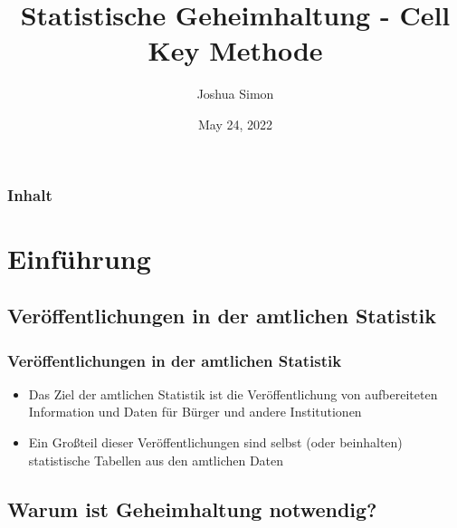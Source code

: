 \documentclass[aspectratio=169]{beamer}
\title[Statistische Geheimhaltung]{Statistische Geheimhaltung - Cell Key Methode} %
\author{Joshua Simon} %
\institute[University Bamberg] %
{
Otto-Friedrich-University Bamberg \\ %
\medskip
\textit{joshua-guenter.simon@stud.uni-bamberg.de} %
}
\date{May 24, 2022} %
\begin{document}
\begin{frame}
\titlepage %
\end{frame}

\begin{frame}
\frametitle{Inhalt} %
\tableofcontents %
\end{frame}



\section{Einführung} 

\subsection{Veröffentlichungen in der amtlichen Statistik}

\begin{frame}{}
    \frametitle{Veröffentlichungen in der amtlichen Statistik}
    \begin{itemize}
        \item Das Ziel der amtlichen Statistik ist die Veröffentlichung von aufbereiteten Information und Daten für Bürger und andere Institutionen
        \item Ein Großteil dieser Veröffentlichungen sind selbst (oder beinhalten) statistische Tabellen aus den amtlichen Daten
    \end{itemize}
\end{frame}


\subsection{Warum ist Geheimhaltung notwendig?}
\end{document}
